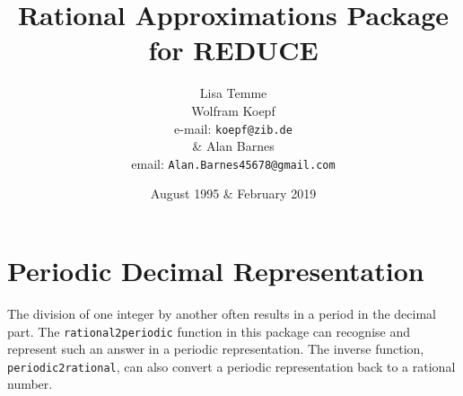 \title{{\bf Rational Approximations Package for REDUCE}}
\author{Lisa Temme\\Wolfram Koepf\\ e-mail: {\tt koepf@zib.de}\\\& Alan Barnes\\ email: {\tt Alan.Barnes45678@gmail.com}}
\date{August 1995 \& February 2019}

\maketitle

\section{Periodic Decimal Representation}

The division of one integer by another often results in
a period in the decimal part. The {\tt rational2periodic}
function in this package can recognise and represent
such an answer in a periodic representation. The inverse
function, {\tt periodic2rational}, can also convert a
periodic representation back to a rational number.\\


